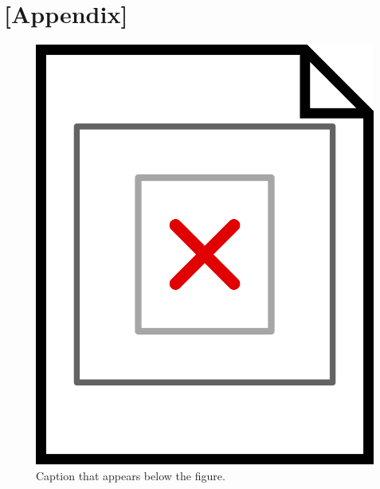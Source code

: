 

\setcounter{chapter}{0}
\renewcommand\thechapter{\Alph{chapter}}

\captionsetup[table]{list=no}
\captionsetup[figure]{list=no}

\begingroup
\renewcommand{\cleardoublepage}{}
\renewcommand{\clearpage}{}
\vspace*{-5em}

\chapter{[Appendix]}
\label{ch:appendix}

\vspace*{-1em}
\begin{figure}[H]
\centering
\captionsetup{justification=centering}
\includegraphics[width=\textwidth]{Images/placeholder}
\caption[Caption that appears in the table of contents]{Caption that appears below the figure.}
\label{fig:figure}
\vspace{-0.5em}
\end{figure}

\endgroup
